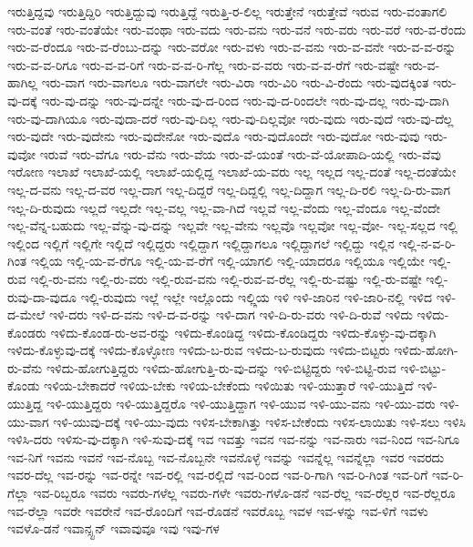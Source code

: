 {ಇರುತ್ತಿದ್ದವು
ಇರುತ್ತಿದ್ದಿರಿ
ಇರುತ್ತಿದ್ದುವು
ಇರುತ್ತಿದ್ದೆ
ಇರುತ್ತಿ-ರ-ಲಿಲ್ಲ
ಇರುತ್ತೇನೆ
ಇರುತ್ತೇವೆ
ಇರುವ
ಇರು-ವಂತಾಗಲಿ
ಇರು-ವಂತೆ
ಇರು-ವಂತೆಯೇ
ಇರು-ವಂಥಾ
ಇರು-ವದು
ಇರು-ವನು
ಇರು-ವನೆ
ಇರು-ವರು
ಇರು-ವರೆ
ಇರು-ವ-ರೆಂದು
ಇರು-ವ-ರೆಂದೂ
ಇರು-ವ-ರೆಂಬು-ದನ್ನು
ಇರು-ವರೋ
ಇರು-ವಳು
ಇರು-ವ-ವನು
ಇರು-ವ-ವನೇ
ಇರು-ವ-ವ-ರನ್ನು
ಇರು-ವ-ವ-ರಿಗೂ
ಇರು-ವ-ವ-ರಿಗೆ
ಇರು-ವ-ವ-ರಿ-ಗೆಲ್ಲ
ಇರು-ವ-ವರು
ಇರು-ವ-ವ-ರೆಗೆ
ಇರು-ವಷ್ಟೇ
ಇರು-ವ-ಹಾಗಿಲ್ಲ
ಇರು-ವಾಗ
ಇರು-ವಾಗಲೂ
ಇರು-ವಾಗಲೇ
ಇರು-ವಿರಾ
ಇರು-ವಿರಿ
ಇರು-ವಿ-ರೆಂದು
ಇರು-ವುದಕ್ಕಿಂತ
ಇರು-ವು-ದಕ್ಕೆ
ಇರು-ವು-ದನ್ನು
ಇರು-ವು-ದನ್ನೇ
ಇರು-ವು-ದ-ರಿಂದ
ಇರು-ವು-ದ-ರಿಂದಲೇ
ಇರು-ವು-ದಲ್ಲ
ಇರು-ವು-ದಾಗಿ
ಇರು-ವು-ದಾಗಿಯೂ
ಇರು-ವುದಾ-ದರೆ
ಇರು-ವು-ದಿಲ್ಲ
ಇರು-ವು-ದಿಲ್ಲವೋ
ಇರು-ವುದು
ಇರು-ವುದೆ
ಇರು-ವು-ದೆಲ್ಲ
ಇರು-ವುದೇ
ಇರು-ವುದೇನು
ಇರು-ವುದೇನೋ
ಇರು-ವುದೊ
ಇರು-ವುದೊಂದೇ
ಇರು-ವುದೋ
ಇರು-ವುವು
ಇರು-ವುವೋ
ಇರುವೆ
ಇರು-ವೆಗೂ
ಇರು-ವೆನು
ಇರು-ವೆಯ
ಇರು-ವೆ-ಯಂತೆ
ಇರು-ವೆ-ಯೋಪಾದಿ-ಯಲ್ಲಿ
ಇರು-ವೆವು
ಇರೋಣ
ಇಲಾಖೆ
ಇಲಾಖೆ-ಯಲ್ಲಿ
ಇಲಾಖೆ-ಯಲ್ಲಿದ್ದ
ಇಲಾಖೆ-ಯ-ವರು
ಇಲ್ಲ
ಇಲ್ಲದ
ಇಲ್ಲ-ದಂತೆ
ಇಲ್ಲ-ದಂತೆಯೇ
ಇಲ್ಲ-ದ-ವನು
ಇಲ್ಲ-ದ-ವರ
ಇಲ್ಲ-ದಾಗ
ಇಲ್ಲ-ದಿದ್ದರೆ
ಇಲ್ಲ-ದಿದ್ದಲ್ಲಿ
ಇಲ್ಲ-ದಿದ್ದಾಗ
ಇಲ್ಲ-ದಿ-ರಲಿ
ಇಲ್ಲ-ದಿ-ರು-ವಾಗ
ಇಲ್ಲ-ದಿ-ರುವುದು
ಇಲ್ಲದೆ
ಇಲ್ಲದೇ
ಇಲ್ಲ-ವಲ್ಲ
ಇಲ್ಲ-ವಾ-ಗಿದೆ
ಇಲ್ಲವೆ
ಇಲ್ಲ-ವೆಂದು
ಇಲ್ಲ-ವೆಂದೂ
ಇಲ್ಲ-ವೆಂದೇ
ಇಲ್ಲ-ವೆನ್ನ-ಬಹುದು
ಇಲ್ಲ-ವೆನ್ನು-ವು-ದನ್ನು
ಇಲ್ಲವೇ
ಇಲ್ಲ-ವೇನು
ಇಲ್ಲವೊ
ಇಲ್ಲವೋ
ಇಲ್ಲ-ವೋ-
ಇಲ್ಲ-ಸಲ್ಲದ
ಇಲ್ಲಿ
ಇಲ್ಲಿಂದ
ಇಲ್ಲಿಗೆ
ಇಲ್ಲಿಗೇ
ಇಲ್ಲಿದೆ
ಇಲ್ಲಿದ್ದರು
ಇಲ್ಲಿದ್ದಾಗ
ಇಲ್ಲಿದ್ದಾಗಲೂ
ಇಲ್ಲಿದ್ದಾಗಲೆ
ಇಲ್ಲಿದ್ದು
ಇಲ್ಲಿನ
ಇಲ್ಲಿ-ನ-ವ-ರಿ-ಗಿಂತ
ಇಲ್ಲಿಯ
ಇಲ್ಲಿ-ಯ-ವ-ರೆಗೂ
ಇಲ್ಲಿ-ಯ-ವ-ರೆಗೆ
ಇಲ್ಲಿ-ಯಾಗಲಿ
ಇಲ್ಲಿ-ಯಾದರೂ
ಇಲ್ಲಿಯೂ
ಇಲ್ಲಿಯೇ
ಇಲ್ಲಿ-ರುವ
ಇಲ್ಲಿ-ರು-ವನು
ಇಲ್ಲಿ-ರು-ವರು
ಇಲ್ಲಿ-ರುವ-ವನು
ಇಲ್ಲಿ-ರುವ-ವ-ರೆಲ್ಲ
ಇಲ್ಲಿ-ರು-ವಷ್ಟು
ಇಲ್ಲಿ-ರು-ವಷ್ಟೇ
ಇಲ್ಲಿ-ರುವು-ದಾ-ವುದೂ
ಇಲ್ಲಿ-ರುವುದು
ಇಲ್ಲೆ
ಇಲ್ಲೇ
ಇಲ್ಲೊಂದು
ಇಲ್ಲ್ಲಿಯ
ಇಳಿ
ಇಳಿ-ಜಾರಿನ
ಇಳಿ-ಜಾರಿ-ನಲ್ಲಿ
ಇಳಿದ
ಇಳಿ-ದ-ಮೇಲೆ
ಇಳಿ-ದರು
ಇಳಿ-ದ-ವನು
ಇಳಿ-ದ-ವ-ರನ್ನು
ಇಳಿ-ದಾಗ
ಇಳಿ-ದಿ-ರು-ವರು
ಇಳಿ-ದಿ-ರುವೆ
ಇಳಿದು
ಇಳಿದು-ಕೊಂಡರು
ಇಳಿದು-ಕೊಂಡ-ರು-ಅವ-ರನ್ನು
ಇಳಿದು-ಕೊಂಡಿದ್ದ
ಇಳಿದು-ಕೊಂಡಿದ್ದರು
ಇಳಿದು-ಕೊಳ್ಳು-ವು-ದಕ್ಕಾಗಿ
ಇಳಿದು-ಕೊಳ್ಳುವು-ದಕ್ಕೆ
ಇಳಿದು-ಕೊಳ್ಳೋಣ
ಇಳಿದು-ಬ-ರುವ
ಇಳಿದು-ಬ-ರುವುದು
ಇಳಿದು-ಬಿಟ್ಟರು
ಇಳಿದು-ಹೋಗಿ-ರು-ವೆನು
ಇಳಿದು-ಹೋಗುತ್ತಿದ್ದರು
ಇಳಿದು-ಹೋಗುತ್ತಿ-ರು-ವು-ದನ್ನು
ಇಳಿ-ಬಿಟ್ಟಿದ್ದರು
ಇಳಿ-ಬಿಟ್ಟಿ-ರುವ
ಇಳಿ-ಬಿಟ್ಟು-ಕೊಂಡು
ಇಳಿಯ-ಬೇಕಾದರೆ
ಇಳಿಯ-ಬೇಕು
ಇಳಿಯ-ಬೇಕೆಂದು
ಇಳಿಯಿತು
ಇಳಿ-ಯುತ್ತಾರೆ
ಇಳಿ-ಯುತ್ತಿದೆ
ಇಳಿ-ಯುತ್ತಿದ್ದ
ಇಳಿ-ಯುತ್ತಿದ್ದರು
ಇಳಿ-ಯುತ್ತಿದ್ದರೊ
ಇಳಿ-ಯುತ್ತಿದ್ದಾಗ
ಇಳಿ-ಯುವ
ಇಳಿ-ಯು-ವನು
ಇಳಿ-ಯು-ವರು
ಇಳಿ-ಯು-ವಾಗ
ಇಳಿ-ಯುವು-ದಕ್ಕೆ
ಇಳಿ-ಯು-ವುದು
ಇಳಿಸ-ಬೇಕಾಗಿತ್ತು
ಇಳಿಸ-ಬೇಕೆಂದು
ಇಳಿಸ-ಲಾಯಿತು
ಇಳಿ-ಸಲು
ಇಳಿಸಿ
ಇಳಿಸಿ-ದರು
ಇಳಿಸು-ವು-ದಕ್ಕಾಗಿ
ಇಳಿ-ಸುವು-ದಕ್ಕೆ
ಇವ
ಇವತ್ತು
ಇವನ
ಇವ-ನನ್ನು
ಇವ-ನಾರು
ಇವ-ನಿಂದ
ಇವ-ನಿಗೂ
ಇವ-ನಿಗೆ
ಇವನು
ಇವನೆ
ಇವ-ನೊಬ್ಬ
ಇವ-ನೊಬ್ಬನೇ
ಇವನೊಳ್ಳೆ
ಇವನ್ನು
ಇವನ್ನೆಲ್ಲ
ಇವನ್ನೆಲ್ಲಾ
ಇವರ
ಇವರದು
ಇವರ-ದೆಲ್ಲ
ಇವ-ರನ್ನು
ಇವ-ರನ್ನೇ
ಇವ-ರಲ್ಲಿ
ಇವ-ರಲ್ಲಿದೆ
ಇವ-ರಿಂದ
ಇವ-ರಿ-ಗಾಗಿ
ಇವ-ರಿ-ಗಿಂತ
ಇವ-ರಿಗೆ
ಇವ-ರಿ-ಗೆಲ್ಲಾ
ಇವ-ರಿಬ್ಬರೂ
ಇವರು
ಇವರು-ಗಳೆಲ್ಲ
ಇವರು-ಗಳೇ
ಇವರು-ಗಳೊ-ಡನೆ
ಇವ-ರೆಲ್ಲ
ಇವ-ರೆಲ್ಲರ
ಇವ-ರೆಲ್ಲರೂ
ಇವ-ರೆಲ್ಲಾ
ಇವರೇ
ಇವರೇನೆ
ಇವ-ರೊಂದಿಗೆ
ಇವ-ರೊಡನೆ
ಇವರೊಬ್ಬ
ಇವಳ
ಇವ-ಳನ್ನು
ಇವ-ಳಿಗೆ
ಇವಳು
ಇವಳೊ-ಡನೆ
ಇವಾನ್ಸ್ಟನ್
ಇವಾವುವೂ
ಇವು
ಇವು-ಗಳ
}
